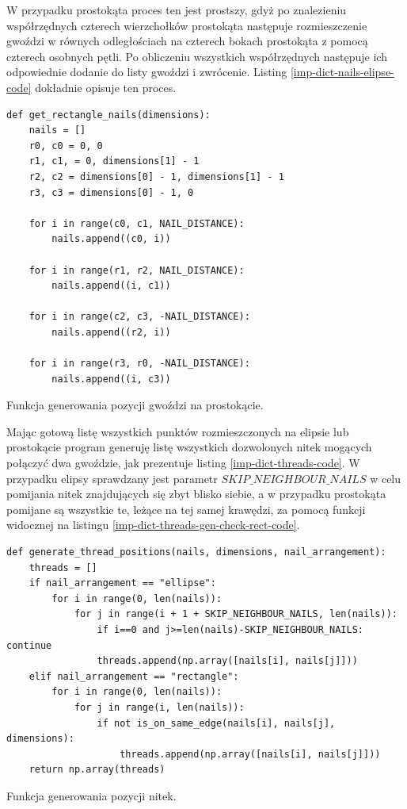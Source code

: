         W przypadku prostokąta proces ten jest prostszy, gdyż po znalezieniu współrzędnych czterech wierzchołków prostokąta następuje rozmieszczenie gwoździ w równych odległościach na czterech bokach prostokąta z pomocą czterech osobnych pętli. Po obliczeniu wszystkich współrzędnych następuje ich odpowiednie dodanie do listy gwoździ i zwrócenie. Listing \ref{imp-dict-nails-elipse-code} dokładnie opisuje ten proces.
        \begin{code}[H]
        \begin{verbatim}
def get_rectangle_nails(dimensions):
    nails = []
    r0, c0 = 0, 0
    r1, c1, = 0, dimensions[1] - 1
    r2, c2 = dimensions[0] - 1, dimensions[1] - 1
    r3, c3 = dimensions[0] - 1, 0

    for i in range(c0, c1, NAIL_DISTANCE):
        nails.append((c0, i))

    for i in range(r1, r2, NAIL_DISTANCE):
        nails.append((i, c1))

    for i in range(c2, c3, -NAIL_DISTANCE):
        nails.append((r2, i))
        
    for i in range(r3, r0, -NAIL_DISTANCE):
        nails.append((i, c3))
        \end{verbatim}
        \caption{Funkcja generowania pozycji gwoździ na prostokącie.}
        \label{imp-dict-nails-rectange-code}
        \end{code}
        
        Mając gotową listę wszystkich punktów rozmieszczonych na elipsie lub prostokącie program generuję listę wszystkich dozwolonych nitek mogących połączyć dwa gwoździe, jak prezentuje listing \ref{imp-dict-threads-code}. W przypadku elipsy sprawdzany jest parametr \(SKIP\_NEIGHBOUR\_NAILS\) w celu pomijania nitek znajdujących się zbyt blisko siebie, a w przypadku prostokąta pomijane są wszystkie te, leżące na tej samej krawędzi, za pomocą funkcji widocznej na listingu \ref{imp-dict-threads-gen-check-rect-code}. 
        \begin{code}[H]
        \begin{verbatim}
def generate_thread_positions(nails, dimensions, nail_arrangement):
    threads = []
    if nail_arrangement == "ellipse":
        for i in range(0, len(nails)):
            for j in range(i + 1 + SKIP_NEIGHBOUR_NAILS, len(nails)):
                if i==0 and j>=len(nails)-SKIP_NEIGHBOUR_NAILS: continue
                threads.append(np.array([nails[i], nails[j]]))
    elif nail_arrangement == "rectangle":
        for i in range(0, len(nails)):
            for j in range(i, len(nails)):
                if not is_on_same_edge(nails[i], nails[j], dimensions):
                    threads.append(np.array([nails[i], nails[j]]))
    return np.array(threads)
        \end{verbatim}
        \caption{Funkcja generowania pozycji nitek.}
        \label{imp-dict-threads-code}
        \end{code}
        

